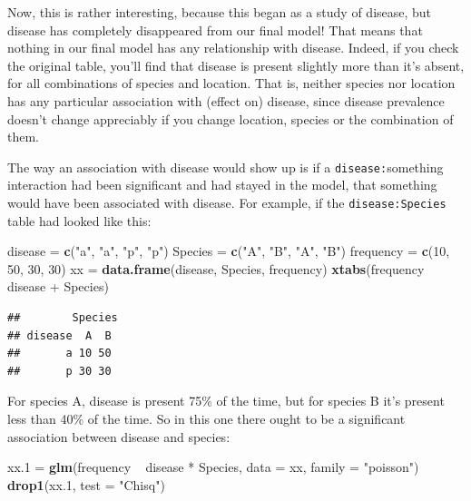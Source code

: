 \documentclass[]{tufte-book}
\newenvironment{Shaded}{}{}
\newcommand{\DataTypeTok}[1]{\textcolor[rgb]{0.56,0.13,0.00}{#1}}
\newcommand{\DecValTok}[1]{\textcolor[rgb]{0.25,0.63,0.44}{#1}}
\newcommand{\FloatTok}[1]{\textcolor[rgb]{0.25,0.63,0.44}{#1}}
\newcommand{\KeywordTok}[1]{\textcolor[rgb]{0.00,0.44,0.13}{\textbf{#1}}}
\newcommand{\NormalTok}[1]{#1}
\newcommand{\OperatorTok}[1]{\textcolor[rgb]{0.40,0.40,0.40}{#1}}
\newcommand{\StringTok}[1]{\textcolor[rgb]{0.25,0.44,0.63}{#1}}
\theoremstyle{definition}
\theoremstyle{definition}
\theoremstyle{definition}
\theoremstyle{remark}
\begin{document}
Now, this is rather interesting, because this began as a study of
disease, but disease has completely disappeared from our final model!
That means that nothing in our final model has any relationship with
disease. Indeed, if you check the original table, you'll find that
disease is present slightly more than it's absent, for all combinations
of species and location. That is, neither species nor location has any
particular association with (effect on) disease, since disease
prevalence doesn't change appreciably if you change location, species or
the combination of them.

The way an association with disease would show up is if a
\texttt{disease:}something interaction had been significant and had
stayed in the model, that something would have been associated with
disease. For example, if the \texttt{disease:Species} table had looked
like this:

\begin{Shaded}
\begin{Highlighting}[]
\NormalTok{disease =}\StringTok{ }\KeywordTok{c}\NormalTok{(}\StringTok{"a"}\NormalTok{, }\StringTok{"a"}\NormalTok{, }\StringTok{"p"}\NormalTok{, }\StringTok{"p"}\NormalTok{)}
\NormalTok{Species =}\StringTok{ }\KeywordTok{c}\NormalTok{(}\StringTok{"A"}\NormalTok{, }\StringTok{"B"}\NormalTok{, }\StringTok{"A"}\NormalTok{, }\StringTok{"B"}\NormalTok{)}
\NormalTok{frequency =}\StringTok{ }\KeywordTok{c}\NormalTok{(}\DecValTok{10}\NormalTok{, }\DecValTok{50}\NormalTok{, }\DecValTok{30}\NormalTok{, }\DecValTok{30}\NormalTok{)}
\NormalTok{xx =}\StringTok{ }\KeywordTok{data.frame}\NormalTok{(disease, Species, frequency)}
\KeywordTok{xtabs}\NormalTok{(frequency }\OperatorTok{~}\StringTok{ }\NormalTok{disease }\OperatorTok{+}\StringTok{ }\NormalTok{Species)}
\end{Highlighting}
\end{Shaded}

\begin{verbatim}
##        Species
## disease  A  B
##       a 10 50
##       p 30 30
\end{verbatim}

For species A, disease is present 75\% of the time, but for species B
it's present less than 40\% of the time. So in this one there ought to
be a significant association between disease and species:

\begin{Shaded}
\begin{Highlighting}[]
\NormalTok{xx}\FloatTok{.1}\NormalTok{ =}\StringTok{ }\KeywordTok{glm}\NormalTok{(frequency }\OperatorTok{~}\StringTok{ }\NormalTok{disease }\OperatorTok{*}\StringTok{ }\NormalTok{Species, }\DataTypeTok{data =}\NormalTok{ xx, }
    \DataTypeTok{family =} \StringTok{"poisson"}\NormalTok{)}
\KeywordTok{drop1}\NormalTok{(xx}\FloatTok{.1}\NormalTok{, }\DataTypeTok{test =} \StringTok{"Chisq"}\NormalTok{)}
\end{Highlighting}
\end{Shaded}
\end{document}
